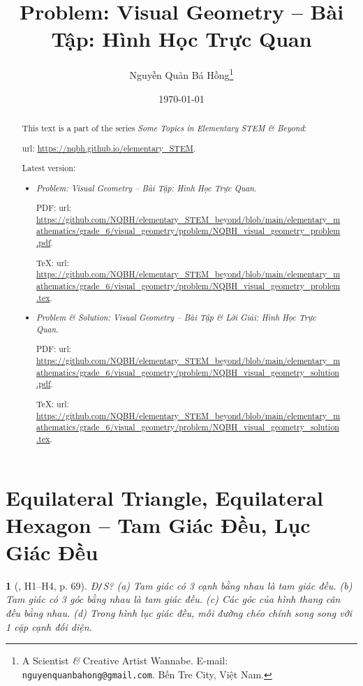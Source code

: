 \documentclass{article}
\title{Problem: Visual Geometry -- Bài Tập: Hình Học Trực Quan}
\author{Nguyễn Quản Bá Hồng\footnote{A Scientist {\it\&} Creative Artist Wannabe. E-mail: {\tt nguyenquanbahong@gmail.com}. Bến Tre City, Việt Nam.}}
\date{\today}
\newtheorem{baitoan}{}
\begin{document}
\maketitle
\begin{abstract}
	This text is a part of the series {\it Some Topics in Elementary STEM \& Beyond}:
	
	{\sc url}: \url{https://nqbh.github.io/elementary_STEM}.
	
	Latest version:
	\begin{itemize}
		\item {\it Problem: Visual Geometry -- Bài Tập: Hình Học Trực Quan}.
		
		PDF: {\sc url}: \url{https://github.com/NQBH/elementary_STEM_beyond/blob/main/elementary_mathematics/grade_6/visual_geometry/problem/NQBH_visual_geometry_problem.pdf}.
		
		\TeX: {\sc url}: \url{https://github.com/NQBH/elementary_STEM_beyond/blob/main/elementary_mathematics/grade_6/visual_geometry/problem/NQBH_visual_geometry_problem.tex}.
		\item {\it Problem \& Solution: Visual Geometry -- Bài Tập \& Lời Giải: Hình Học Trực Quan}.
		
		PDF: {\sc url}: \url{https://github.com/NQBH/elementary_STEM_beyond/blob/main/elementary_mathematics/grade_6/visual_geometry/problem/NQBH_visual_geometry_solution.pdf}.
		
		\TeX: {\sc url}: \url{https://github.com/NQBH/elementary_STEM_beyond/blob/main/elementary_mathematics/grade_6/visual_geometry/problem/NQBH_visual_geometry_solution.tex}.
	\end{itemize}
\end{abstract}
\tableofcontents


\section{Equilateral Triangle, Equilateral Hexagon -- Tam Giác Đều, Lục Giác Đều}

\begin{baitoan}[\cite{Binh_boi_duong_Toan_6_tap_1}, H1--H4, p. 69]
	{\rm Đ{\tt/}S?} (a) Tam giác có 3 cạnh bằng nhau là tam giác đều. (b) Tam giác có 3 góc bằng nhau là tam giác đều. (c) Các góc của hình thang cân đều bằng nhau. (d) Trong hình lục giác đều, mỗi đường chéo chính song song với 1 cặp cạnh đối diện.
\end{baitoan}
\end{document}
